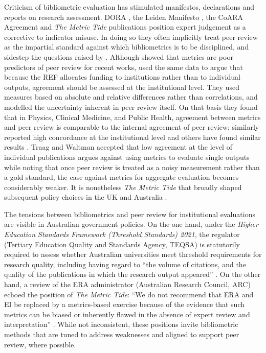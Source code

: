 Criticism of bibliometric evaluation has stimulated manifestos, declarations and reports on research assessment. DORA \citep{allenPracticalGuideImplementing2025}, the Leiden Manifesto \citep{hicksBibliometricsLeidenManifesto2015}, the CoARA Agreement \citep{coara} and \textit{The Metric Tide} publications \citep{wilsdonMetricTide2015, hill2015literature, HEFCE-II,  curryHarnessingMetricTide2022} position expert judgement as a corrective to indicator misuse. In doing so they often implicitly treat peer review as the impartial standard against which bibliometrics is to be disciplined, and sidestep the questions raised by \citeauthor{leeBiasPeerReview2013}. Although \cite{HEFCE-II} showed that metrics are poor predictors of peer review for recent works, \cite{traagSystematicAnalysisAgreement2019} used the same data to argue that because the REF allocates funding to institutions rather than to individual outputs, agreement should be assessed at the institutional level. They used measures based on absolute and relative differences rather than correlations, and modelled the uncertainty inherent in peer review itself. On that basis they found that in Physics, Clinical Medicine, and Public Health, agreement between metrics and peer review is comparable to the internal agreement of peer review; \cite{pridePeerReviewCitation2018} similarly reported high concordance at the institutional level and others have found similar results \citep{butlerMetricsPeerReview2009a, checchiHaveYouRead2021, traagMetricsPeerReview2025}. Traag and Waltman accepted that low agreement at the level of individual publications argues against using metrics to evaluate single outputs \citep[see also][]{bacciniTheyAgreeBibliometric2016} while noting that once peer review is treated as a noisy measurement rather than a gold standard, the case against metrics for aggregate evaluation becomes considerably weaker. It is nonetheless \textit{The Metric Tide} that broadly shaped subsequent policy choices in the UK \citep{frameworkBuildingSuccessLearning2016} and Australia \citep{sheil2023trusting, maryokaneAustralianUniversitiesAccord2024}.

The tensions between bibliometrics and peer review for institutional evaluations are visible in Australian government policies.  On the one hand, under the \textit{Higher Education Standards Framework (Threshold Standards) 2021}, the regulator (Tertiary Education Quality and Standards Agency, TEQSA) is statutorily required to assess whether Australian universities meet threshold requirements for research quality, including having regard to \enquote{the volume of citations, and the quality of the publications in which the research output appeared} \citep[][Sect.~5]{teqsa2021determination}. On the other hand, a review of the ERA administrator (Australian Research Council, ARC) echoed the position of \textit{The Metric Tide}: \enquote{We do not recommend that ERA and EI be replaced by a metrics-based exercise because of the evidence that such metrics can be biased or inherently flawed in the absence of expert review and interpretation} \citep[p.~86]{sheil2023trusting}. While not inconsistent, these positions invite bibliometric methods that are tuned to address weaknesses and aligned to support peer review, where possible.

